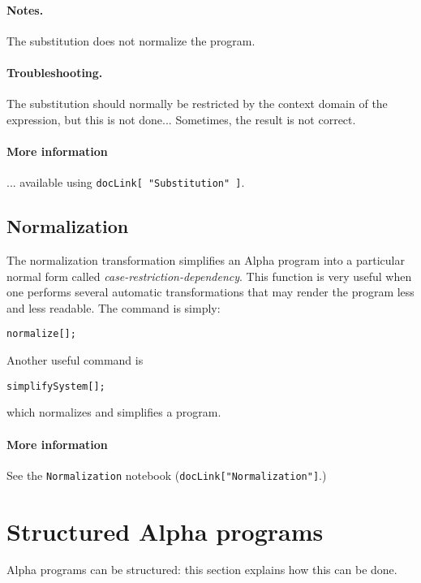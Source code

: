 \documentclass[12pt]{article}
\newcommand{\Alpha}{{\sc Alpha}}
\newcommand{\alfa}{\Alpha}
\begin{document}
\paragraph*{Notes.} The substitution does not normalize the 
program. 

\paragraph*{Troubleshooting.} The substitution should normally
be restricted by the context domain of the expression, but this
is not done... Sometimes, the result is not correct. 

\paragraph*{More information}
... available using \texttt{docLink[ "Substitution" ]}.

\subsection{Normalization}
\label{normalization}
The normalization transformation simplifies an {\Alpha} program into a
{particular} normal form called {\em case-restriction-dependency}.
This function is very useful when one performs several automatic
transformations that may render the program less and less
readable. The command is simply: 
\begin{verbatim}
normalize[];
\end{verbatim}
Another useful command is 
\begin{verbatim}
simplifySystem[];
\end{verbatim}
which normalizes and simplifies a program.

\paragraph*{More information}
See the \texttt{Normalization} notebook
(\texttt{docLink["Normalization"]}.)

\section{Structured  {\Alpha} programs}
\label{structured}
\label{sectstruct}
\alfa{} programs can be structured: this section explains 
how this can be done. 
\end{document}

